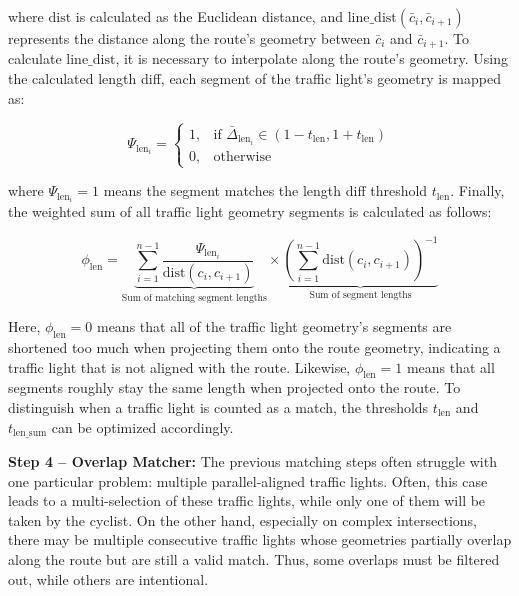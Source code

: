 where $\text{dist}$ is calculated as the Euclidean distance, and $\text{line\_dist}(\bar{c}_i, \bar{c}_{i+1})$ represents the distance along the route's geometry between $\bar{c}_i$ and $\bar{c}_{i+1}$. To calculate $\text{line\_dist}$, it is necessary to interpolate along the route's geometry. Using the calculated length diff, each segment of the traffic light's geometry is mapped as:

\begin{equation}
\Psi_{\text{len}_i} = 
    \begin{cases}
            1,& \text{if } \bar{\Delta}_{\text{len}_{i}} \in \left(1 - t_{\text{len}}, 1 + t_{\text{len}}\right)\\
            0,              & \text{otherwise}
        \end{cases}
\end{equation}

where $\Psi_{\text{len}_i} = 1$ means the segment matches the length diff threshold $t_{\text{len}}$. Finally, the weighted sum of all traffic light geometry segments is calculated as follows:

\begin{equation} 
\phi_{\text{len}} = 
    \underbrace{\sum_{i=1}^{n-1} 
    \frac{\Psi_{\text{len}_i}}{\text{dist}(c_i, c_{i+1})}}_{\text{Sum of matching segment lengths}}
    \times
    \underbrace{(\sum_{i=1}^{n-1} \text{dist}(c_i, c_{i+1}))^{-1}}_{\text{Sum of segment lengths}}
\end{equation}

Here, $\phi_{\text{len}} = 0$ means that all of the traffic light geometry's segments are shortened too much when projecting them onto the route geometry, indicating a traffic light that is not aligned with the route. Likewise, $\phi_{\text{len}} = 1$ means that all segments roughly stay the same length when projected onto the route. To distinguish when a traffic light is counted as a match, the thresholds $t_{\text{len}}$ and $t_{\text{len\_sum}}$ can be optimized accordingly.

\textbf{\color{cidarkblue}Step 4 -- Overlap Matcher:} The previous matching steps often struggle with one particular problem: multiple parallel-aligned traffic lights. Often, this case leads to a multi-selection of these traffic lights, while only one of them will be taken by the cyclist. On the other hand, especially on complex intersections, there may be multiple consecutive traffic lights whose geometries partially overlap along the route but are still a valid match. Thus, some overlaps must be filtered out, while others are intentional.

